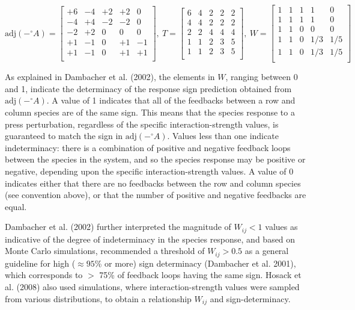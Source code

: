 \documentclass[11pt]{article}
\begin{document}
\[
    \text{adj}(-^\circ A) =
    \begin{bmatrix}
    +6 & -4&+2&+2& 0 \\
    -4 & +4&-2&-2& 0 \\
    -2 & +2& 0& 0& 0 \\
    +1 & -1& 0&+1&-1 \\
    +1 & -1& 0&+1&+1 \\
    \end{bmatrix},
    \:
    T =
    \begin{bmatrix}
     6&4&2&2&2 \\
     4&4&2&2&2 \\
     2&2&4&4&4 \\
     1&1&2&3&5 \\
     1&1&2&3&5 \\
    \end{bmatrix},
    \:
        W = \begin{bmatrix}
     1 &    1 &    1 &    1 &    0 \\
     1 &    1 &    1 &    1 &    0\\
     1 &    1 &    0 &    0 &    0\\
     1 &    1 &    0 &  1/3 &  1/5\\
     1 &    1 &    0 &  1/3 &  1/5\\
    \end{bmatrix}
\]

As explained in Dambacher et al. (2002), the elements in \(W\), ranging
between 0 and 1, indicate the determinacy of the response sign
prediction obtained from \(\text{adj}(-^\circ A)\). A value of 1
indicates that all of the feedbacks between a row and column species are
of the same sign. This means that the species response to a press
perturbation, regardless of the specific interaction-strength values, is
guaranteed to match the sign in \(\text{adj}(-^\circ A)\). Values less
than one indicate indeterminacy: there is a combination of positive and
negative feedback loops between the species in the system, and so the
species response may be positive or negative, depending upon the
specific interaction-strength values. A value of 0 indicates either that
there are no feedbacks between the row and column species (see
convention above), or that the number of positive and negative feedbacks
are equal.

Dambacher et al. (2002) further interpreted the magnitude of
\(W_{ij} < 1\) values as indicative of the degree of indeterminacy in
the species response, and based on Monte Carlo simulations, recommended
a threshold of \(W_{ij} > 0.5\) as a general guideline for high
(\(\approx 95\)\% or more) sign determinacy (Dambacher et al. 2001),
which corresponds to \(>\) 75\% of feedback loops having the same sign.
Hosack et al. (2008) also used simulations, where interaction-strength
values were sampled from various distributions, to obtain a relationship
\(W_{ij}\) and sign-determinacy.
\end{document}
